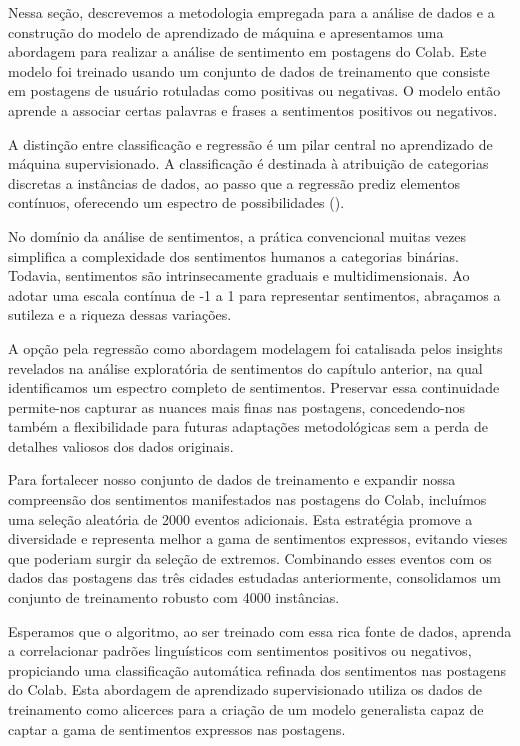 Nessa seção, descrevemos a metodologia empregada para a análise de dados e a construção do modelo de aprendizado de máquina e apresentamos uma abordagem para realizar a análise de sentimento em postagens do Colab. Este modelo foi treinado usando um conjunto de dados de treinamento que consiste em postagens de usuário rotuladas como positivas ou negativas. O modelo então aprende a associar certas palavras e frases a sentimentos positivos ou negativos.

A distinção entre classificação e regressão é um pilar central no aprendizado de máquina supervisionado. A classificação é destinada à atribuição de categorias discretas a instâncias de dados, ao passo que a regressão prediz elementos contínuos, oferecendo um espectro de possibilidades ().

No domínio da análise de sentimentos, a prática convencional muitas vezes simplifica a complexidade dos sentimentos humanos a categorias binárias. Todavia, sentimentos são intrinsecamente graduais e multidimensionais. Ao adotar uma escala contínua de -1 a 1 para representar sentimentos, abraçamos a sutileza e a riqueza dessas variações.

A opção pela regressão como abordagem modelagem foi catalisada pelos insights revelados na análise exploratória de sentimentos do capítulo anterior, na qual identificamos um espectro completo de sentimentos. Preservar essa continuidade permite-nos capturar as nuances mais finas nas postagens, concedendo-nos também a flexibilidade para futuras adaptações metodológicas sem a perda de detalhes valiosos dos dados originais.

Para fortalecer nosso conjunto de dados de treinamento e expandir nossa compreensão dos sentimentos manifestados nas postagens do Colab, incluímos uma seleção aleatória de 2000 eventos adicionais. Esta estratégia promove a diversidade e representa melhor a gama de sentimentos expressos, evitando vieses que poderiam surgir da seleção de extremos. Combinando esses eventos com os dados das postagens das três cidades estudadas anteriormente, consolidamos um conjunto de treinamento robusto com 4000 instâncias.

Esperamos que o algoritmo, ao ser treinado com essa rica fonte de dados, aprenda a correlacionar padrões linguísticos com sentimentos positivos ou negativos, propiciando uma classificação automática refinada dos sentimentos nas postagens do Colab. Esta abordagem de aprendizado supervisionado utiliza os dados de treinamento como alicerces para a criação de um modelo generalista capaz de captar a gama de sentimentos expressos nas postagens.

